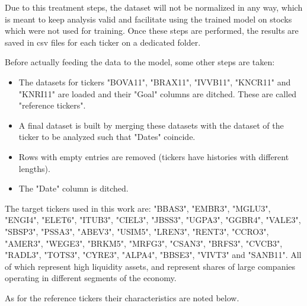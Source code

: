 \documentclass[conference]{IEEEtran}
\begin{document}
Due to this treatment steps, the dataset will not be normalized in any way, which is meant to keep analysis valid and facilitate using the trained model on stocks which were not used for training. Once these steps are performed, the results are saved in csv files for each ticker on a dedicated folder.

Before actually feeding the data to the model, some other steps are taken:

\begin{itemize}
    \item The datasets for tickers "BOVA11", "BRAX11", "IVVB11", "KNCR11" and "KNRI11" are loaded and their "Goal" columns are ditched. These are called "reference tickers".
    \item A final dataset is built by merging these datasets with the dataset of the ticker to be analyzed such that "Dates" coincide.
    \item Rows with empty entries are removed (tickers have histories with different lengths).
    \item The "Date" column is ditched.
\end{itemize}

The target tickers used in this work are: "BBAS3", "EMBR3", "MGLU3", "ENGI4", "ELET6", "ITUB3", "CIEL3", "JBSS3", "UGPA3", "GGBR4", "VALE3", "SBSP3", "PSSA3", "ABEV3", "USIM5", "LREN3", "RENT3", "CCRO3", "AMER3", "WEGE3", "BRKM5", "MRFG3", "CSAN3", "BRFS3", "CVCB3", "RADL3", "TOTS3", "CYRE3", "ALPA4", "BBSE3", "VIVT3" and "SANB11". All of which represent high liquidity assets, and represent shares of large companies operating in different segments of the economy. 

As for the reference tickers their characteristics are noted below.
\end{document}
